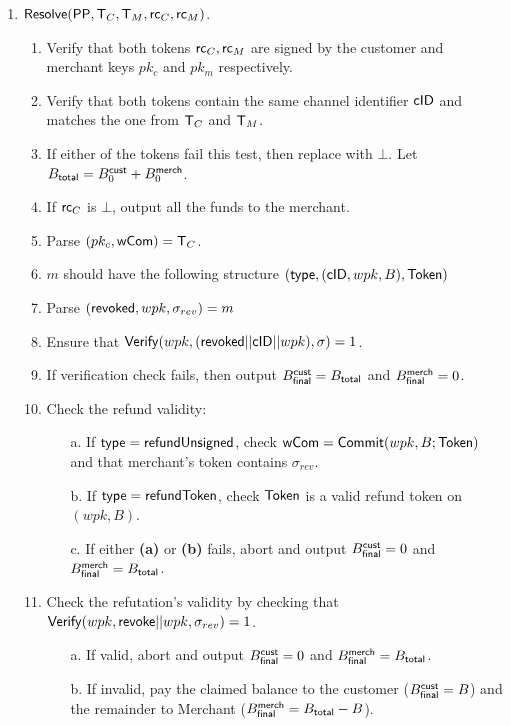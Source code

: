 \documentclass[11pt]{report}
\newcommand{\BC}{B^{\text{\sf cust}}_{\text{0}}}
\newcommand{\BM}{B^{\text{\sf merch}}_{\text{0}}}
\begin{document}
\begin{enumerate}
\item ${\sf Resolve}({\sf PP}, {\sf T}_{C}, {\sf T}_{M}, {\sf rc}_{C}, {\sf rc}_{M})$. 
\begin{enumerate}

\item Verify that both tokens ${\sf rc}_{C}, {\sf rc}_{M}$ are signed by the customer and merchant keys $pk_c$ and $pk_{m}$ respectively. 
\item Verify that both tokens contain the same channel identifier ${\sf cID}$ and matches the one from ${\sf T}_{C}$ and ${\sf T}_{M}$. 
\item If either of the tokens fail this test, then replace with $\bot$. Let $B_{\sf total} = \BC + \BM$. 
\item If ${\sf rc}_{C}$ is $\bot$, output all the funds to the merchant.
\item Parse $(pk_c, {\sf wCom}) = {\sf T}_{C}$.
\item $m$ should have the following structure $({\sf type}, ({\sf cID}, wpk, B), {\sf Token})$
\item Parse $({\sf revoked}, wpk, \sigma_{rev}) = m$
\item Ensure that ${\sf Verify}(wpk, ({\sf revoked}||{\sf cID}||wpk), \sigma) = 1$.
\item If verification check fails, then output ${B_{\sf final}^{\sf cust}} = B_{\sf total}$ and ${B_{\sf final}^{\sf merch}} = 0$.
\item Check the refund validity: 
\begin{enumerate}
\item[a.] If ${\sf type} = {\sf refundUnsigned}$, check ${\sf wCom} = {\sf Commit}(wpk, B; {\sf Token})$ and that merchant's token contains $\sigma_{rev}$.
\item[b.] If ${\sf type} = {\sf refundToken}$, check ${\sf Token}$ is a valid refund token on $(wpk, B)$.
\item[c.] If either {\bf (a)} or {\bf (b)} fails, abort and output ${B_{\sf final}^{\sf cust}} = 0$ and ${B_{\sf final}^{\sf merch}} = B_{\sf total}$.
\end{enumerate}
\item Check the refutation's validity by checking that ${\sf Verify}(wpk, {\sf revoke}||wpk, \sigma_{rev}) = 1$.
\begin{enumerate}
\item[a.] If valid, abort and output ${B_{\sf final}^{\sf cust}} = 0$ and ${B_{\sf final}^{\sf merch}} = B_{\sf total}$.
\item[b.] If invalid, pay the claimed balance to the customer (${B_{\sf final}^{\sf cust}} = B$) and the remainder to Merchant (${B_{\sf final}^{\sf merch}} = B_{\sf total} - B$).
\end{enumerate}

\end{enumerate}


\end{enumerate}
\end{document}
